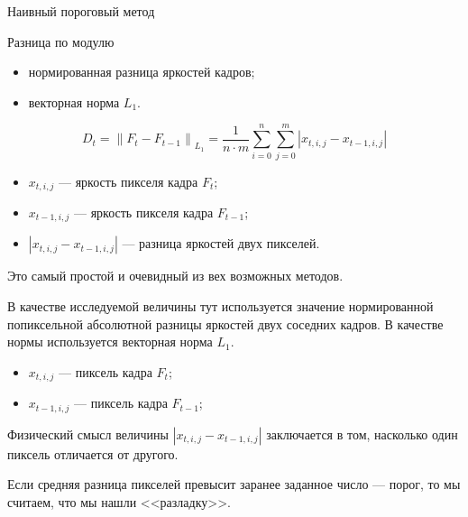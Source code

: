 \begin{frame}{Наивный пороговый метод}
    \begin{gray-box}{Разница по модулю}
        \begin{itemize}
            \item нормированная разница яркостей кадров;
            \item векторная норма $L_1$.
        \end{itemize}
    \end{gray-box}
    \vspace{0.5em}
    \begin{gray-box}{}
        \[
        D_t            
        = \left\| F_t - F_{t-1} \right\|_{L_1} 
        = \dfrac{1}{n \cdot m} 
        \sum\limits_{i=0}^{n}
        \sum\limits_{j=0}^{m}
        \left| x_{t,i,j} - x_{t-1,i,j} \right| 
        \]
        \begin{itemize}
            \item $x_{t,i,j}$ 
                — яркость пикселя кадра $F_t$;
            \item $x_{t-1,i,j}$ 
                — яркость пикселя кадра $F_{t-1}$;
            \item $\left| x_{t,i,j} - x_{t-1,i,j} \right|$
                — разница яркостей двух пикселей.
        \end{itemize}
    \end{gray-box}
\end{frame}

\begin{note-frame}
    Это самый простой и очевидный из вех возможных методов.
    
    В качестве исследуемой величины тут используется 
    значение нормированной попиксельной 
    абсолютной разницы яркостей двух соседних кадров.
    В качестве нормы используется векторная норма $L_1$.
    \begin{itemize}
        \item $x_{t,i,j}$ — пиксель кадра $F_t$;
        \item $x_{t-1,i,j}$ — пиксель кадра $F_{t-1}$;
    \end{itemize}
    
    Физический смысл величины 
    $\left| x_{t,i,j} - x_{t-1,i,j} \right|$
    заключается в том, насколько один пиксель отличается от другого.
    
    Если средняя разница пикселей превысит заранее заданное число — порог,
    то мы считаем, что мы нашли <<разладку>>.
    
\end{note-frame}

